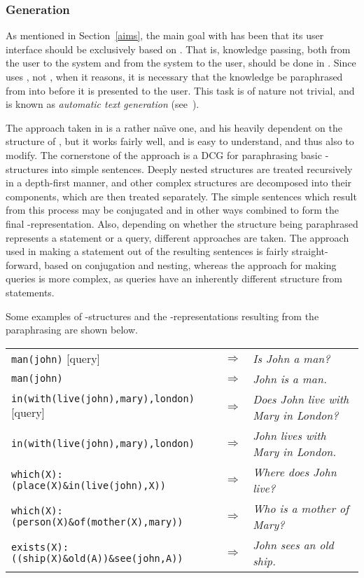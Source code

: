 \subsubsection{Generation}

As mentioned in Section~\ref{aims}, the main goal with {\nash} has
been that its user interface should be exclusively based on {\nal}.
That is, knowledge passing, both from the user to the system and from
the system to the user, should be done in {\nal}. Since {\nash} uses
{\niks}, not {\nal}, when it reasons, it is necessary that the
knowledge be paraphrased from {\niks} into {\nal} before it is
presented to the user. This task is of nature not trivial, and is
known as {\em automatic text generation\/} (see~\cite{gal}).

The approach taken in {\nash} is a rather na\"{\i}ve one, and his
heavily dependent on the structure of {\niks}, but it works fairly
well, and is easy to understand, and thus also to modify. The
cornerstone of the approach is a DCG for paraphrasing basic
{\niks}-structures into simple sentences. Deeply nested structures are
treated recursively in a depth-first manner, and other complex
structures are decomposed into their components, which are then
treated separately. The simple sentences which result from this
process may be conjugated and in other ways combined to form the final
{\nal}-representation. Also, depending on whether the structure being
paraphrased represents a statement or a query, different approaches
are taken. The approach used in making a statement out of the
resulting sentences is fairly straight-forward, based on conjugation
and nesting, whereas the approach for making queries is more complex,
as queries have an inherently different structure from statements.

Some examples of {\niks}-structures and the {\nal}-representations
resulting from the paraphrasing are shown below.

\begin{center}
\begin{tabular}{lcl}
  {\tt man(john)} [query] & $\Rightarrow$ & {\em Is John a man?\/} \\
  {\tt man(john)}         & $\Rightarrow$ & {\em John is a man.\/} \\
  {\tt in(with(live(john),mary),london)} [query] & $\Rightarrow$ &
  {\em Does John live with Mary in London?\/} \\
  {\tt in(with(live(john),mary),london)} & $\Rightarrow$ &
  {\em John lives with Mary in London.\/} \\
  {\tt which(X):(place(X)\&in(live(john),X))} & $\Rightarrow$ &
  {\em Where does John live?\/} \\
  {\tt which(X):(person(X)\&of(mother(X),mary))} & $\Rightarrow$ &
  {\em Who is a mother of Mary?\/} \\
  {\tt exists(X):((ship(X)\&old(A))\&see(john,A))} & $\Rightarrow$ &
  {\em John sees an old ship.\/}
\end{tabular}
\end{center}

